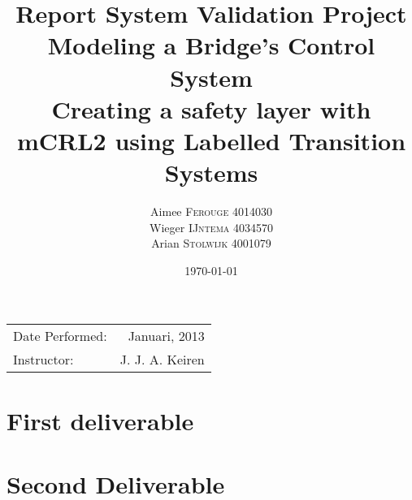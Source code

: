 \documentclass{article}
\title{Report System Validation Project \\ Modeling a Bridge's Control System\\ Creating a safety layer with mCRL2 using Labelled Transition Systems} %
\author{Aimee \textsc{Ferouge} 4014030 \\Wieger \textsc{IJntema} 4034570 \\Arian \textsc{Stolwijk} 4001079} %
\date{\today} %
\begin{document}
\maketitle %

\begin{center}
\begin{tabular}{l r}
Date Performed: & Januari, 2013 \\ %
Instructor: & J. J. A. Keiren %
\end{tabular}
\end{center}


 

\section{First deliverable}






\section{Second Deliverable}


%
%
%
%
%
\end{document}
